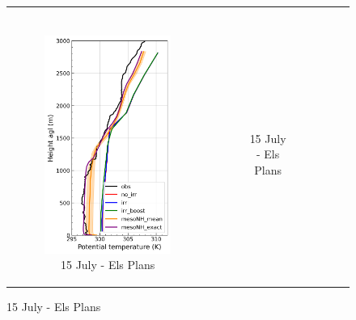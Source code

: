 \begin{figure}[hbtp]
{\begin{tabular}{@{}cccc@{}}
\begin{subfigure}[t]{0.283\textwidth}
        \end{subfigure} \\
        \begin{subfigure}[t]{0.382\textwidth}
            \caption{15 July - Els Plans}
            \includegraphics[width=\textwidth]{images/chap6/profiles/profile_elsplans_theta_1507_.png}
        \end{subfigure} &
        \begin{subfigure}[t]{0.289\textwidth}
            \caption{15 July - Els Plans}

\end{subfigure}
\end{tabular}}
\end{figure}
